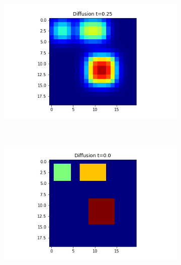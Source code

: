 \documentclass[10pt,a4paper]{article}
\begin{document}
\begin{figure}[!h]
\begin{subfigure}[b]{0.25\textwidth}
    			\caption{}
    			\label{nolongrange3}
    		\end{subfigure}~
    		\begin{subfigure}[b]{0.25\textwidth}
    			\includegraphics[width= \textwidth]{images/nolongrange-t5.png}
    			\caption{}
    			\label{nolongranget5}
    		\end{subfigure}\\
    	\begin{subfigure}[b]{0.25\textwidth}
    		\includegraphics[width= \textwidth]{images/laplace-x3-t0.png}
    		\caption{}
    		\label{laplacet0}
    	\end{subfigure}~
    	\begin{subfigure}[b]{0.25\textwidth}

\end{subfigure}
\end{figure}
\end{document}
